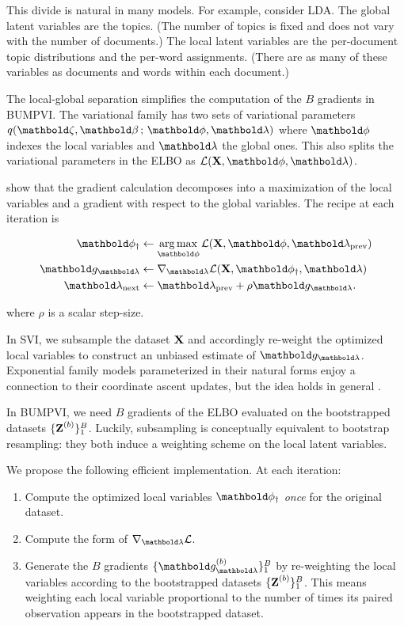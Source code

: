 This divide is natural in many models. For example, consider
\gls{LDA}. The global latent variables are the topics.
(The number of topics is fixed and does not vary with the number of documents.)
The local latent variables are the per-document topic distributions and
the per-word assignments. (There are as many of these variables as documents
and words within each document.)

The local-global separation simplifies the computation of the $B$ gradients
in \gls{BUMPVI}. The variational family
has two sets of variational parameters
$q(\mbzeta, \mbbeta \,;\, \mbphi, \mblambda)$
where $\mbphi$ indexes the local variables and $\mblambda$ the global ones. This
also splits the variational parameters in the \gls{ELBO} as $\cL(\mbX,
\mbphi, \mblambda)$.

\citet{hoffman2013stochastic} show that the gradient calculation decomposes into
a maximization of the local variables and a gradient with respect to the
global variables. The recipe at each iteration is
\begin{linenomath}
\begin{align*}
  \mbphi_{\dagger}
  &\leftarrow
  \argmax_{\mbphi} \cL (\mbX,\mbphi,\mblambda_\text{prev}) \\
  \mb{g}_{\mblambda}
  &\leftarrow
  \nabla_{\mblambda} \cL (\mbX, \mbphi_{\dagger},\mblambda) \\
  \mblambda_\text{next}
  &\leftarrow
  \mblambda_\text{prev} + \rho \mb{g}_{\mblambda}.
\end{align*}
\end{linenomath}
where $\rho$ is a scalar step-size.

In \gls{SVI}, we subsample the dataset $\textbf{X}$ and accordingly re-weight the
optimized local variables to construct an unbiased estimate of
$\mb{g}_{\mblambda}$.
Exponential family models parameterized in their natural forms enjoy a
connection to their coordinate ascent updates, but the idea holds in general
\citep{hoffman2013stochastic}.

In \gls{BUMPVI}, we need $B$ gradients of the \gls{ELBO} evaluated on the
bootstrapped datasets $\{\textbf{Z}^{(b)}\}_1^B$. Luckily, subsampling is conceptually
equivalent to bootstrap resampling: they both induce a weighting scheme on
the local latent variables.

We propose the following efficient implementation. At each iteration:
\begin{enumerate}
  \item Compute the optimized local variables $\mbphi_\dagger$ \emph{once} for
  the original dataset.
  \item Compute the form of $\nabla_{\mblambda} \cL$.
  \item Generate the $B$ gradients $\{\mb{g}_{\mblambda}^{(b)}\}_1^B$ by
  re-weighting the local variables according to the bootstrapped datasets
  $\{\textbf{Z}^{(b)}\}_1^B$. This means weighting each local variable proportional
  to the number of times its paired observation appears in the bootstrapped
  dataset.
\end{enumerate}

